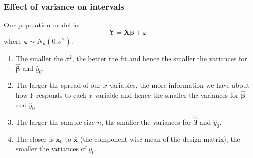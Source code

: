 \documentclass[a4paper]{article}\usepackage[]{graphicx}\usepackage[]{xcolor}
\begin{document}
\subsubsection{Effect of variance on intervals}
Our population model is:
\[
	\symbf{Y} = \symbf{X}\symbf{\beta} + \symbf{\varepsilon}
\]
where \( \symbf{\varepsilon} \sim N_n (0,\sigma^2) \).
\begin{enumerate}
	\item The smaller the \( \sigma^2 \), the better the fit and hence the smaller the variances for \( \hat{\symbf{\beta}} \) and \( \hat{y}_0 \).
	\item The larger the spread of our \( x \) variables, the more information we have about how \( Y \) responds to each \( x \) variable and hence the smaller the variances for \( \hat{\symbf{\beta}} \) and \( \hat{y}_0 \).
	\item The larger the sample size \( n \), the smaller the variances for \( \hat{\symbf{\beta}} \) and \( \hat{y}_0 \).
	\item The closer is \( \symbf{x}_0 \) to \( \overline{\symbf{x}} \)  (the component-wise mean of the design matrix), the smaller the variances of \( \hat{y}_0 \).
\end{enumerate}
\end{document}
